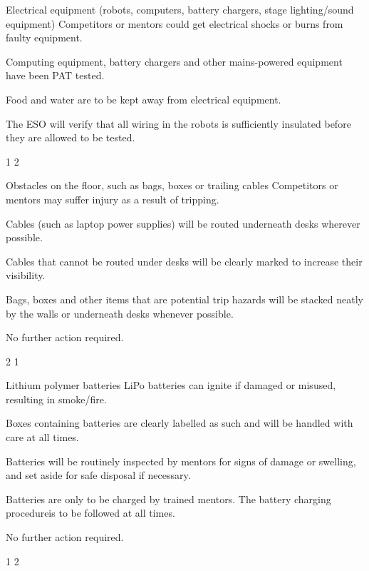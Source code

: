 {    \risk
        {Electrical equipment (robots, computers, battery chargers,
         stage lighting/sound equipment)}
        {Competitors or mentors could get electrical shocks or burns from faulty
         equipment.}
        {\item Computing equipment, battery chargers and other mains-powered
         equipment have been PAT tested.
         \item Food and water are to be kept away from electrical equipment.}
        {\item The ESO will verify that all wiring in the robots is sufficiently
         insulated before they are allowed to be tested.}
        {1} %
        {2} %

    \risk
        {Obstacles on the floor, such as bags, boxes or trailing cables}
        {Competitors or mentors may suffer injury as a result of tripping.}
        {\item Cables (such as laptop power supplies) will be routed underneath
         desks wherever possible.
         \item Cables that cannot be routed under desks will be clearly marked
         to increase their visibility.
         \item Bags, boxes and other items that are potential trip hazards will
         be stacked neatly by the walls or underneath desks whenever possible.}
        {\item No further action required.}
        {2} %
        {1} %

    \risk
        {Lithium polymer batteries}
        {LiPo batteries can ignite if damaged or misused, resulting in
         smoke/fire.}
        {\item Boxes containing batteries are clearly labelled as such and will
         be handled with care at all times.
         \item Batteries will be routinely inspected by mentors for signs of
         damage or swelling, and set aside for safe disposal if necessary.
         \item Batteries are only to be charged by trained mentors. The battery
         charging procedure\chargingfootnote is to be followed at all times.}
        {\item No further action required.}
        {1} %
        {2} %
}


\newcommand{\postrisks}{
    \subsection*{Risk of fire}

    To minimise the risk of fire resulting from this activity, food and drink
    will not be allowed near electrical equipment, and naked flames will be
    prohibited. The risk of fire occurring elsewhere in the building(s) is
    controlled primarily by the building operator\estatesfacilitiesfootnote.
    The ESO will ensure that all people present are informed of the locations of
    the exits and that no fire drills are expected to take place.
}



